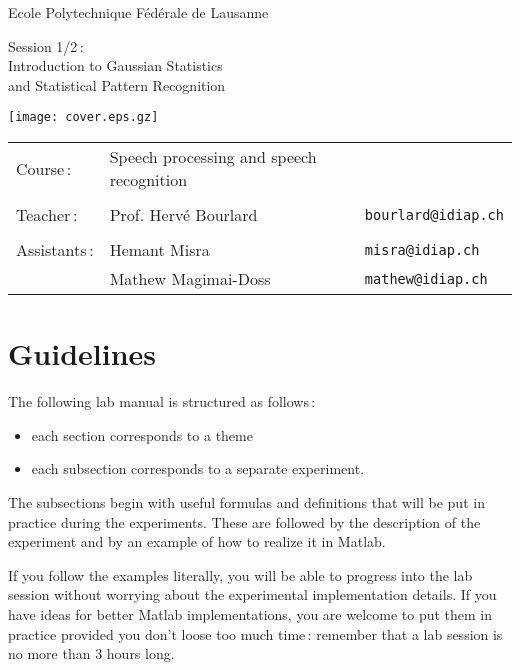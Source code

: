 \documentclass[twoside,a4paper,titlepage]{article}
\begin{document}
\begin{titlepage}
\setcounter{page}{-1}

\centerline{Ecole Polytechnique F\'ed\'erale de Lausanne}

\vspace{5cm}

\begin{center}
\huge
Session 1/2\,: \\
Introduction to Gaussian Statistics \\
and Statistical Pattern Recognition
\end{center}

\vfill

\centerline{\texttt{[image: cover.eps.gz]}}

\vfill

\noindent
\begin{tabular}{lll}
Course\,: & Speech processing and speech recognition & \\
& & \\
Teacher\,: & Prof. Herv\'e Bourlard \hspace{1cm} & {\tt bourlard@idiap.ch} \\
& & \\
Assistants\,: & Hemant Misra & {\tt misra@idiap.ch}\\
 & Mathew Magimai-Doss & {\tt mathew@idiap.ch} 
\end{tabular}

\end{titlepage}

\thispagestyle{empty}
\section*{Guidelines}
The following lab manual is structured as follows\,:
\begin{itemize}
\item each section corresponds to a theme
\item each subsection corresponds to a separate experiment.
\end{itemize}
The subsections begin with useful formulas and definitions that will be put
in practice during the experiments. These are followed by the description
of the experiment and by an example of how to realize it in {\sc Matlab}.

If you follow the examples literally, you will be able to progress into the
lab session without worrying about the experimental implementation
details. If you have ideas for better {\sc Matlab} implementations, you are
welcome to put them in practice provided you don't loose too much time\,:
remember that a lab session is no more than 3 hours long.
\end{document}
